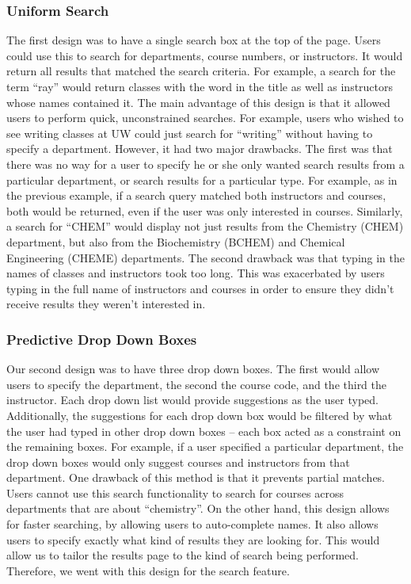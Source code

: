\documentclass{chi2009}
\begin{document}
\subsubsection{Uniform Search}
The first design was to have a single search box at the top of the page. Users could use this to search for departments, course numbers, or instructors. It would return all results that matched the search criteria. For example, a search for the term ``ray'' would return classes with the word in the title as well as instructors whose names contained it. The main advantage of this design is that it allowed users to perform quick, unconstrained searches. For example, users who wished to see writing classes at UW could just search for ``writing'' without having to specify a department. However, it had two major drawbacks. The first was that there was no way for a user to specify he or she only wanted search results from a particular department, or search results for a particular type. For example, as in the previous example, if a search query matched both instructors and courses, both would be returned, even if the user was only interested in courses. Similarly, a search for ``CHEM'' would display not just results from the Chemistry (CHEM) department, but also from the Biochemistry (BCHEM) and Chemical Engineering (CHEME) departments. The second drawback was that typing in the names of classes and instructors took too long. This was exacerbated by users typing in the full name of instructors and courses in order to ensure they didn't receive results they weren't interested in.

\subsubsection{Predictive Drop Down Boxes}
Our second design was to have three drop down boxes. The first would allow users to specify the department, the second the course code, and the third the instructor. Each drop down list would provide suggestions as the user typed. Additionally, the suggestions for each drop down box would be filtered by what the user had typed in other drop down boxes -- each box acted as a constraint on the remaining boxes. For example, if a user specified a particular department, the drop down boxes would only suggest courses and instructors from that department. One drawback of this method is that it prevents partial matches. Users cannot use this search functionality to search for courses across departments that are about ``chemistry''. On the other hand, this design allows for faster searching, by allowing users to auto-complete names. It also allows users to specify exactly what kind of results they are looking for. This would allow us to tailor the results page to the kind of search being performed. Therefore, we went with this design for the search feature.
\end{document}
